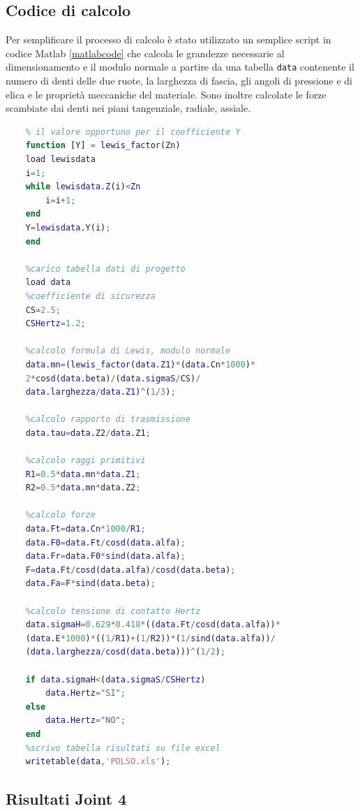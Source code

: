\documentclass[%
corpo=11pt,
twoside,
 stile=classica,
oldstyle,
greek,%
]{toptesi}
\begin{document}
	\subsection{Codice di calcolo}
	Per semplificare il processo di calcolo è stato utilizzato un semplice script in codice Matlab \ref{matlabcode} che calcola le grandezze necessarie al dimensionamento e il modulo normale a partire da una tabella \verb|data| contenente il numero di denti delle due ruote, la larghezza di fascia, gli angoli di pressione e di elica e le proprietà meccaniche del materiale. Sono inoltre calcolate le forze scambiate dai denti nei piani tangenziale, radiale, assiale.
	\label{matlabcode}
	\begin{lstlisting}[language=Matlab]
	% La funzione lewis_factor ricerca all'iterno della tabella lewisdata
	% il valore opportuno per il coefficiente Y
	function [Y] = lewis_factor(Zn)
	load lewisdata
	i=1;
	while lewisdata.Z(i)<Zn
		i=i+1;
	end
	Y=lewisdata.Y(i);
	end
	
	%carico tabella dati di progetto 
	load data
	%coefficiente di sicurezza
	CS=2.5;
	CSHertz=1.2;
	
	%calcolo formula di Lewis, modulo normale
	data.mn=(lewis_factor(data.Z1)*(data.Cn*1000)*
	2*cosd(data.beta)/(data.sigmaS/CS)/
	data.larghezza/data.Z1)^(1/3);
	
	%calcolo rapporto di trasmissione
	data.tau=data.Z2/data.Z1;
	
	%calcolo raggi primitivi 
	R1=0.5*data.mn*data.Z1;
	R2=0.5*data.mn*data.Z2;
	
	%calcolo forze
	data.Ft=data.Cn*1000/R1;
	data.F0=data.Ft/cosd(data.alfa);
	data.Fr=data.F0*sind(data.alfa);
	F=data.Ft/cosd(data.alfa)/cosd(data.beta);
	data.Fa=F*sind(data.beta);
	
	%calcolo tensione di contatto Hertz
	data.sigmaH=0.629*0.418*((data.Ft/cosd(data.alfa))*
	(data.E*1000)*((1/R1)+(1/R2))*(1/sind(data.alfa))/
	(data.larghezza/cosd(data.beta)))^(1/2);
	
	if data.sigmaH<(data.sigmaS/CSHertz)
		data.Hertz="SI";
	else
		data.Hertz="NO";
	end
	%scrivo tabella risultati su file excel
	writetable(data,'POLSO.xls');
	\end{lstlisting}
	
		
		
		
		\newpage
		\subsection{Risultati Joint 4}
		
\end{document}
